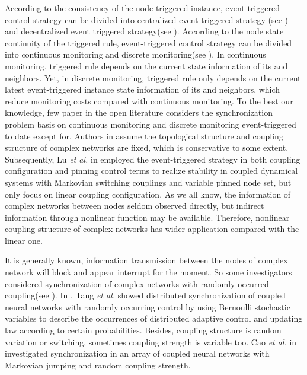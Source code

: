 According to the consistency of the node triggered instance, event-triggered control strategy can be divided into centralized event triggered strategy (see \cite{eventcede,event-triggered-consensus}) and decentralized event triggered strategy(see \cite{c4,c5,Eventmultiagentswitching,Eventmultiagentnoises,Eventmultiagentdelay,WSNs,self-triggered}). According to the node state continuity of the triggered rule, event-triggered control strategy can be divided into continuous monitoring and discrete monitoring(see \cite{A-linear-event-triggered,ChenT_event_triggered}). In continuous monitoring, triggered rule depends on the current state information of its and neighbors. Yet, in discrete monitoring, triggered rule only depends on the current latest event-triggered instance state information of its and neighbors, which reduce monitoring costs compared with continuous monitoring. To the best our knowledge, few paper in the open literature considers the synchronization problem basis on continuous monitoring and discrete monitoring event-triggered to date except for\cite{A-linear-event-triggered,ChenT_event_triggered}. Authors in\cite{A-linear-event-triggered} assume the topological structure and coupling structure of complex networks are fixed, which is conservative to some extent. Subsequently, Lu \emph{et al.} in \cite{ChenT_event_triggered} employed the event-triggered strategy in both coupling configuration and pinning control terms to realize stability in coupled dynamical systems with Markovian switching couplings and variable pinned node set, but only focus on  linear coupling configuration. As we all know, the information of complex networks between nodes seldom observed directly, but indirect information through nonlinear function may be available. Therefore, nonlinear coupling structure of complex networks has wider application compared with the linear one.

It is generally known, information transmission between the nodes of complex network will block and appear interrupt for the moment. So some investigators considered synchronization of complex networks with randomly occurred coupling(see \cite{AN-discrete-time-stochastic,A-nonlinear-randomly-switching,randomly-control}). In \cite{randomly-control}, Tang \emph{et al.} showed distributed synchronization of coupled neural networks with randomly occurring control by using Bernoulli stochastic variables to describe the occurrences of distributed adaptive control and updating law according to certain probabilities. Besides, coupling  structure is random variation or switching, sometimes coupling strength is variable too. Cao \emph{et al.} in \cite{A-randomMarkovianDelay} investigated synchronization in an array of coupled neural networks with Markovian jumping and random coupling strength.

